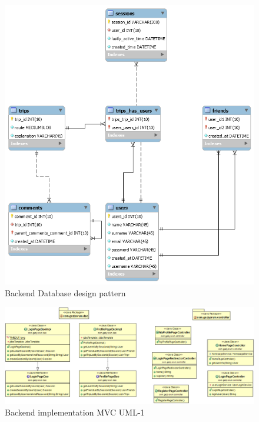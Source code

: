 \begin{figure}[!htbp]
\centering
\includegraphics[width=\textwidth]{projectChapters/images/databaseDesign.png}
\caption{Backend Database design pattern}
\end{figure}
 
 
\begin{figure}[!htbp]
\centering
\includegraphics[width=\textwidth]{projectChapters/images/backend1.png}
\caption{Backend implementation MVC UML-1}
\end{figure}

